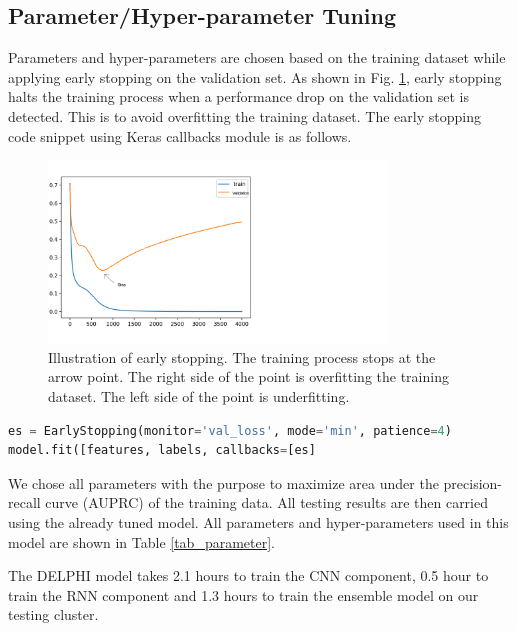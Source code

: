 \subsection{Parameter/Hyper-parameter Tuning}
Parameters and hyper-parameters are chosen based on the training dataset while applying early stopping \cite{prechelt1998early} on the validation set. As shown in Fig. \ref{fig_earlyStop}, early stopping halts the training process when a performance drop on the validation set is detected. This is to avoid overfitting the training dataset. The early stopping code snippet using Keras callbacks module is as follows.
\begin{figure}[!h]
\begin{center}
\includegraphics[width = 9cm]{img/early_stop.png}
\caption{Illustration of early stopping. The training process stops at the arrow point. The right side of the point is overfitting the training dataset. The left side of the point is underfitting. \label{fig_earlyStop}}
\end{center}
\end{figure}

\begin{lstlisting}[language=python,frame=single]
es = EarlyStopping(monitor='val_loss', mode='min', patience=4)
model.fit([features, labels, callbacks=[es]
\end{lstlisting}
We chose all parameters with the purpose to maximize area under the precision-recall curve (AUPRC) of the training data. All testing results are then carried using the already tuned model. All parameters and hyper-parameters used in this model are shown in Table \ref{tab_parameter}.

The DELPHI model takes 2.1 hours to train the CNN component, 0.5 hour to train the RNN component and 1.3 hours to train the ensemble model on our testing cluster.

